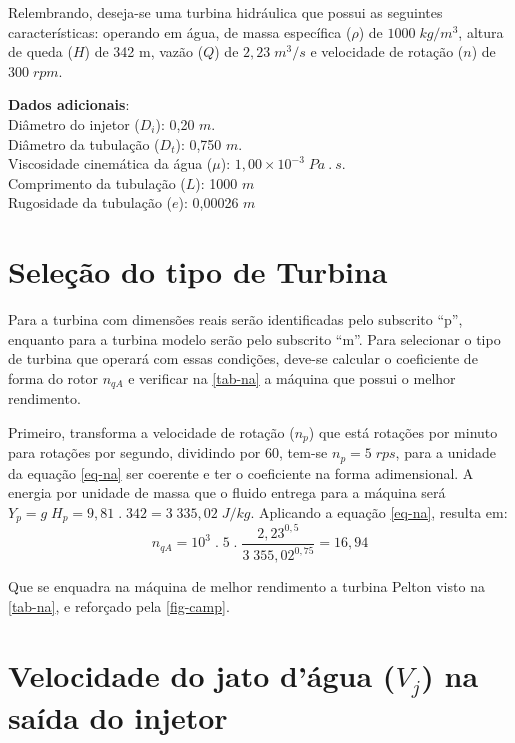 
     Relembrando, deseja-se uma turbina hidráulica que possui as seguintes características: operando em água, de massa específica ($\rho$) de $1000\;kg/m^3$, altura de queda ($H$) de 342 m, vazão ($Q$) de $2,23\;m^3/s$ e velocidade de rotação ($n$) de $300\;rpm$.

    \noindent
    \textbf{Dados adicionais}: \\
    Diâmetro do injetor ($D_i$): 0,20 $m$. \\
    Diâmetro da tubulação ($D_t$): 0,750 $m$. \\
    Viscosidade cinemática da água ($\mu$): $1,00 \times 10^{-3}\; Pa\:.\:s$. \\
    Comprimento da tubulação ($L$): 1000 $m$ \\
    Rugosidade da tubulação ($e$): 0,00026 $m$


\section{Seleção do tipo de Turbina}

    Para a turbina com dimensões reais serão identificadas pelo subscrito ``p'', enquanto para a turbina modelo serão pelo subscrito ``m''. Para selecionar o tipo de turbina que operará com essas condições, deve-se calcular o coeficiente de forma do rotor $n_{qA}$ e verificar na \autoref{tab-na} a máquina que possui o melhor rendimento.


    Primeiro, transforma a velocidade de rotação ($n_p$) que está rotações por minuto para rotações por segundo, dividindo por 60, tem-se $n_p = 5\;rps$, para a unidade da equação \eqref{eq-na} ser coerente e ter o coeficiente na forma adimensional.
    A energia por unidade de massa que o fluido entrega para a máquina será $ Y_p = g \; H_p = 9,81 \; . \; 342 = 3\;335,02\;J/kg $. Aplicando a equação \eqref{eq-na}, resulta em:
    \begin{equation*}
        n_{qA} = 10^3 \; . \; 5 \; . \; \frac{2,23^{0,5}}{3\;355,02^{0,75}} = 16,94
    \end{equation*}

    Que se enquadra na máquina de melhor rendimento a turbina Pelton visto na \autoref{tab-na}, e reforçado pela \autoref{fig-camp}.


\section{Velocidade do jato d'água ($V_j$) na saída do injetor}

